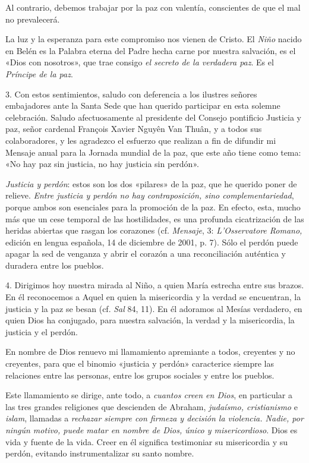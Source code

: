 \documentclass[]{article}
\begin{document}
Al contrario, debemos trabajar por la paz con valentía, conscientes de
que el mal no prevalecerá.

La luz y la esperanza para este compromiso nos vienen de Cristo. El
\emph{Niño} nacido en Belén es la Palabra eterna del Padre hecha carne
por nuestra salvación, es el «Dios con nosotros», que trae consigo
\emph{el secreto de la verdadera paz}. Es el \emph{Príncipe de la paz}.

3. Con estos sentimientos, saludo con deferencia a los ilustres señores
embajadores ante la Santa Sede que han querido participar en esta
solemne celebración. Saludo afectuosamente al presidente del Consejo
pontificio Justicia y paz, señor cardenal François Xavier Nguyên Van
Thuân, y a todos sus colaboradores, y les agradezco el esfuerzo que
realizan a fin de difundir mi Mensaje anual para la Jornada mundial de
la paz, que este año tiene como tema: «No hay paz sin justicia, no hay
justicia sin perdón».

\emph{Justicia y perdón}: estos son los dos «pilares» de la paz, que he
querido poner de relieve. \emph{Entre justicia y perdón no hay
contraposición, sino complementariedad}, porque ambos son esenciales
para la promoción de la paz. En efecto, esta, mucho más que un cese
temporal de las hostilidades, es una profunda cicatrización de las
heridas abiertas que rasgan los corazones (cf. \emph{Mensaje}, 3:
\emph{L'Osservatore Romano,} edición en lengua española, 14 de diciembre
de 2001, p. 7). Sólo el perdón puede apagar la sed de venganza y abrir
el corazón a una reconciliación auténtica y duradera entre los pueblos.

4. Dirigimos hoy nuestra mirada al Niño, a quien María estrecha entre
sus brazos. En él reconocemos a Aquel en quien la misericordia y la
verdad se encuentran, la justicia y la paz se besan (cf. \emph{Sal} 84,
11). En él adoramos al Mesías verdadero, en quien Dios ha conjugado,
para nuestra salvación, la verdad y la misericordia, la justicia y el
perdón.

En nombre de Dios renuevo mi llamamiento apremiante a todos, creyentes y
no creyentes, para que el binomio «justicia y perdón» caracterice
siempre las relaciones entre las personas, entre los grupos sociales y
entre los pueblos.

Este llamamiento se dirige, ante todo, a \emph{cuantos creen en Dios},
en particular a las tres grandes religiones que descienden de Abraham,
\emph{judaísmo, cristianismo} e \emph{islam}, llamadas a \emph{rechazar
siempre con firmeza y decisión la violencia. Nadie, por ningún motivo,
puede matar en nombre de Dios, único y misericordioso}. Dios es vida y
fuente de la vida. Creer en él significa testimoniar su misericordia y
su perdón, evitando instrumentalizar su santo nombre.
\end{document}
